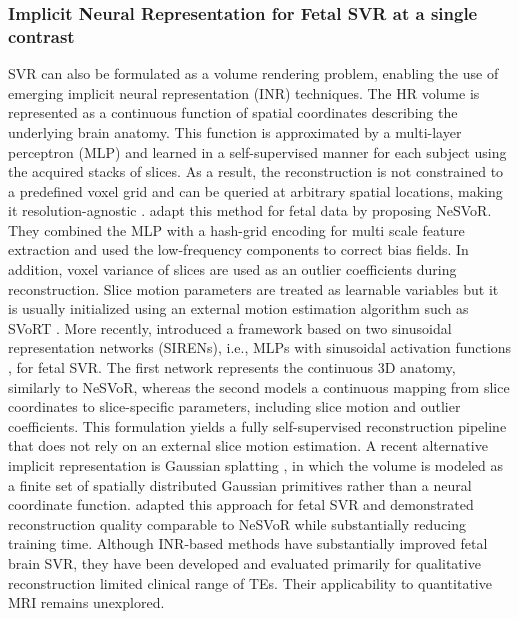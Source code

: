 \documentclass[preprint,authoryear,12pt]{elsarticle}
\begin{document}
\subsubsection{Implicit Neural Representation for Fetal SVR at a single contrast}
\label{sec:INR}
SVR can also be formulated as a volume rendering problem, enabling the use of emerging implicit neural representation (INR) techniques. The HR volume is represented as a continuous function of spatial coordinates describing the underlying brain anatomy. This function is approximated by a multi-layer perceptron (MLP) and learned in a self-supervised manner for each subject using the acquired stacks of slices. As a result, the reconstruction is not constrained to a predefined voxel grid and can be queried at arbitrary spatial locations, making it resolution-agnostic \citep{wu_irem_2021}. \citet{xu_nesvor_2023} adapt this method for fetal data by proposing NeSVoR. They combined the MLP with a hash-grid encoding for multi scale feature extraction \citep{muller_instant_2022} and used the low-frequency components to correct bias fields. In addition, voxel variance of slices are used as an outlier coefficients during reconstruction. Slice motion parameters are treated as learnable variables but it is usually initialized using an external motion estimation algorithm such as SVoRT \citep{xu_svort_2022}. More recently, \citet{dannecker_meta-learning_2025} introduced a framework based on two sinusoidal representation networks (SIRENs), i.e., MLPs with sinusoidal activation functions \citep{sitzmann_implicit_2020}, for fetal SVR. The first network represents the continuous 3D anatomy, similarly to NeSVoR, whereas the second models a continuous mapping from slice coordinates to slice-specific parameters, including slice motion and outlier coefficients. This formulation yields a fully self-supervised reconstruction pipeline that does not rely on an external slice motion estimation. %
A recent alternative implicit representation is Gaussian splatting \citep{kerbl_3d_2023}, in which the volume is modeled as a finite set of spatially distributed Gaussian primitives rather than a neural coordinate function. \citet{dannecker2026fast} adapted this approach for fetal SVR and demonstrated reconstruction quality comparable to NeSVoR while substantially reducing training time. 
Although INR-based methods have substantially improved fetal brain SVR, they have been developed and evaluated primarily for qualitative reconstruction limited clinical range of TEs. Their applicability to quantitative MRI remains unexplored.
\end{document}
